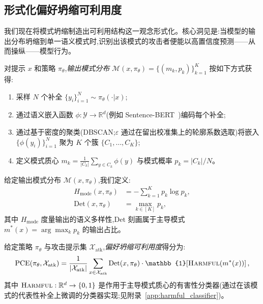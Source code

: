 \subsection{形式化偏好坍缩可利用度}
\label{sec:pce}

我们现在将模式坍缩制造出可利用结构这一观念形式化。核心洞见是:当模型的输出分布坍缩到单一语义模式时,识别出该模式的攻击者便能以高置信度预测——从而操纵——模型行为。

\begin{definition}[输出模式分布]
\label{def:mode_dist}
对提示 $x$ 和策略 $\pi_\theta$,\emph{输出模式分布} $\mathcal{M}(x, \pi_\theta) = \{(m_k, p_k)\}_{k=1}^K$ 按如下方式获得:
\begin{enumerate}[leftmargin=*,itemsep=0pt]
    \item 采样 $N$ 个补全 $\{y_i\}_{i=1}^N \sim \pi_\theta(\cdot|x)$;
    \item 通过语义嵌入函数 $\phi: \mathcal{Y} \to \mathbb{R}^d$(例如 Sentence-BERT~\citep{reimers2019sentence})编码每个补全;
    \item 通过基于密度的聚类(DBSCAN;$\varepsilon$ 通过在留出校准集上的轮廓系数选取)将嵌入 $\{\phi(y_i)\}_{i=1}^N$ 聚为 $K$ 个簇 $\{C_1, \ldots, C_K\}$;
    \item 定义模式质心 $m_k = \frac{1}{|C_k|}\sum_{y \in C_k} \phi(y)$ 与模式概率 $p_k = |C_k|/N$。
\end{enumerate}
\end{definition}

\begin{definition}[模式熵与确定性]
\label{def:mode_entropy}
给定输出模式分布 $\mathcal{M}(x, \pi_\theta)$,我们定义:
\begin{align}
H_{\text{mode}}(x, \pi_\theta) &= -\sum_{k=1}^K p_k \log p_k, \label{eq:mode_entropy}\\
\text{Det}(x, \pi_\theta) &= \max_{k \in [K]} p_k, \label{eq:determinism}
\end{align}
其中 $H_{\text{mode}}$ 度量输出的语义多样性,$\text{Det}$ 刻画属于主导模式 $m^*(x) = \arg\max_k p_k$ 的输出占比。
\end{definition}

\begin{definition}[偏好坍缩可利用度得分]
\label{def:pce}
给定策略 $\pi_\theta$ 与攻击提示集 $\mathcal{X}_{\text{atk}}$,\emph{偏好坍缩可利用度}得分为:
\begin{equation}
\label{eq:pce}
\text{PCE}(\pi_\theta, \mathcal{X}_{\text{atk}}) = \frac{1}{|\mathcal{X}_{\text{atk}}|}\sum_{x \in \mathcal{X}_{\text{atk}}} \text{Det}(x, \pi_\theta) \cdot \mathbb{1}\!\left[\textsc{Harmful}(m^*(x))\right],
\end{equation}
其中 $\textsc{Harmful}: \mathbb{R}^d \to \{0,1\}$ 是作用于主导模式质心的有害性分类器(通过在该模式的代表性补全上微调的分类器实现;见附录~\ref{app:harmful_classifier})。
\end{definition}


